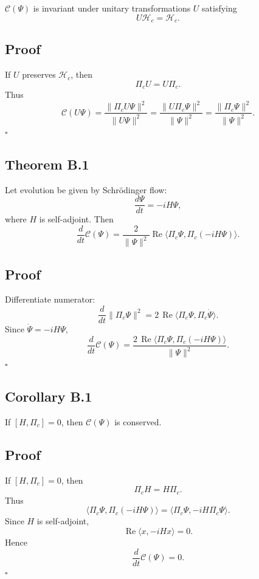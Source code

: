 \documentclass[12pt]{article}
\begin{document}
$\mathcal{C}(\Psi)$ is invariant under unitary transformations $U$ satisfying
\[
U \mathcal{H}_c = \mathcal{H}_c.
\]

\subsection*{Proof}

If $U$ preserves $\mathcal{H}_c$, then
\[
\Pi_c U = U \Pi_c.
\]
Thus
\[
\mathcal{C}(U\Psi)
=
\frac{\|\Pi_c U\Psi\|^2}{\|U\Psi\|^2}
=
\frac{\|U\Pi_c \Psi\|^2}{\|\Psi\|^2}
=
\frac{\|\Pi_c \Psi\|^2}{\|\Psi\|^2}.
\]
\hfill $\square$

\subsection*{Theorem B.1}

Let evolution be given by Schrödinger flow:
\[
\frac{d\Psi}{dt} = -i H \Psi,
\]
where $H$ is self-adjoint. Then
\[
\frac{d}{dt} \mathcal{C}(\Psi)
=
\frac{2}{\|\Psi\|^2}
\operatorname{Re}
\langle \Pi_c \Psi , \Pi_c (-iH\Psi) \rangle.
\]

\subsection*{Proof}

Differentiate numerator:
\[
\frac{d}{dt} \|\Pi_c \Psi\|^2
=
2\,\operatorname{Re}
\langle \Pi_c \Psi, \Pi_c \dot{\Psi} \rangle.
\]
Since $\dot{\Psi} = -iH\Psi$,
\[
\frac{d}{dt} \mathcal{C}(\Psi)
=
\frac{2\,\operatorname{Re}
\langle \Pi_c \Psi , \Pi_c (-iH\Psi) \rangle}{\|\Psi\|^2}.
\]
\hfill $\square$

\subsection*{Corollary B.1}

If $[H, \Pi_c] = 0$, then $\mathcal{C}(\Psi)$ is conserved.

\subsection*{Proof}

If $[H, \Pi_c] = 0$, then
\[
\Pi_c H = H \Pi_c.
\]
Thus
\[
\langle \Pi_c \Psi , \Pi_c (-iH\Psi) \rangle
=
\langle \Pi_c \Psi , -iH \Pi_c \Psi \rangle.
\]
Since $H$ is self-adjoint,
\[
\operatorname{Re} \langle x , -iH x \rangle = 0.
\]
Hence
\[
\frac{d}{dt} \mathcal{C}(\Psi) = 0.
\]
\hfill $\square$
\end{document}
